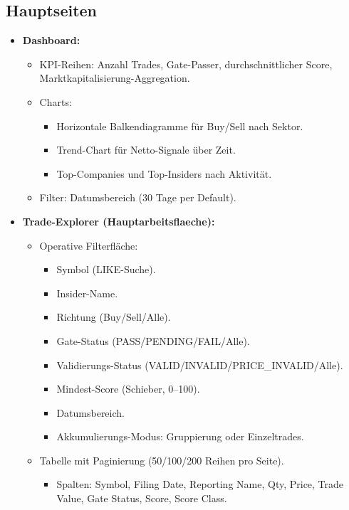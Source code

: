 \subsection{Hauptseiten}
\begin{itemize}
  \item \textbf{Dashboard:} %
    \begin{itemize}
      \item KPI-Reihen: Anzahl Trades, Gate-Passer, durchschnittlicher Score, Marktkapitalisierung-Aggregation.
      \item Charts:
        \begin{itemize}
          \item Horizontale Balkendiagramme für Buy/Sell nach Sektor.
          \item Trend-Chart für Netto-Signale über Zeit.
          \item Top-Companies und Top-Insiders nach Aktivität.
        \end{itemize}
      \item Filter: Datumsbereich (30 Tage per Default). %
    \end{itemize}
  \item \textbf{Trade-Explorer (Hauptarbeitsflaeche):} %
    \begin{itemize}
      \item Operative Filterfläche:
        \begin{itemize}
          \item Symbol (LIKE-Suche).
          \item Insider-Name.
          \item Richtung (Buy/Sell/Alle).
          \item Gate-Status (PASS/PENDING/FAIL/Alle).
          \item Validierungs-Status (VALID/INVALID/PRICE\_INVALID/Alle).
          \item Mindest-Score (Schieber, 0--100).
          \item Datumsbereich.
          \item Akkumulierungs-Modus: Gruppierung oder Einzeltrades.
        \end{itemize}
      \item Tabelle mit Paginierung (50/100/200 Reihen pro Seite). %
        \begin{itemize}
          \item Spalten: Symbol, Filing Date, Reporting Name, Qty, Price, Trade Value, Gate Status, Score, Score Class.

\end{itemize}
\end{itemize}
\end{itemize}
